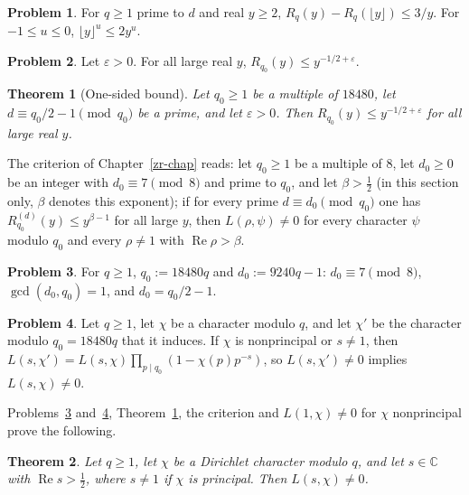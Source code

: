 \documentclass[reqno]{amsart}
\newcounter{chap}
\theoremstyle{definition}
\newtheorem{problem}{Problem}[section]
\theoremstyle{plain}
\newtheorem{theorem}{Theorem}[section]
\newcommand{\C}{{\mathbb{C}}}
\begin{document}
\begin{problem}\label{pr:floor}
For \(q \ge 1\) prime to \(d\) and real \(y \ge 2\), \(R_q(y) - R_q(\lfloor y \rfloor) \le 3/y\).  For \(-1 \le u \le 0\), \(\lfloor y \rfloor^{u} \le 2y^{u}\).
\end{problem}

\begin{problem}\label{pr:reals}
Let \(\varepsilon > 0\).  For all large real \(y\), \(R_{q_0}(y) \le y^{-1/2 + \varepsilon}\).
\end{problem}

\begin{theorem}[One-sided bound]\label{thm:one-sided}
Let \(q_0 \ge 1\) be a multiple of \(18480\), let \(d \equiv q_0/2 - 1 \pmod{q_0}\) be a prime, and let \(\varepsilon > 0\).  Then \(R_{q_0}(y) \le y^{-1/2 + \varepsilon}\) for all large real \(y\).
\end{theorem}

The criterion of Chapter~\ref{zr-chap} reads: let \(q_0 \ge 1\) be a multiple of \(8\), let \(d_0 \ge 0\) be an integer with \(d_0 \equiv 7 \pmod 8\) and prime to \(q_0\), and let \(\beta > \frac12\) (in this section only, \(\beta\) denotes this exponent); if for every prime \(d \equiv d_0 \pmod{q_0}\) one has \(R^{(d)}_{q_0}(y) \le y^{\beta - 1}\) for all large \(y\), then \(L(\rho, \psi) \ne 0\) for every character \(\psi\) modulo \(q_0\) and every \(\rho \ne 1\) with \(\operatorname{Re}\rho > \beta\).

\begin{problem}\label{pr:d0}
For \(q \ge 1\), \(q_0 := 18480q\) and \(d_0 := 9240q - 1\): \(d_0 \equiv 7 \pmod 8\), \(\gcd(d_0, q_0) = 1\), and \(d_0 = q_0/2 - 1\).
\end{problem}

\begin{problem}\label{pr:induced}
Let \(q \ge 1\), let \(\chi\) be a character modulo \(q\), and let \(\chi'\) be the character modulo \(q_0 = 18480q\) that it induces.  If \(\chi\) is nonprincipal or \(s \ne 1\), then \(L(s, \chi') = L(s, \chi)\prod_{p \mid q_0}(1 - \chi(p)p^{-s})\), so \(L(s, \chi') \ne 0\) implies \(L(s, \chi) \ne 0\).
\end{problem}

Problems~\ref{pr:d0} and~\ref{pr:induced}, Theorem~\ref{thm:one-sided}, the criterion and \(L(1, \chi) \ne 0\) for \(\chi\) nonprincipal prove the following.

\begin{theorem}\label{thm:grh}
Let \(q \ge 1\), let \(\chi\) be a Dirichlet character modulo \(q\), and let \(s \in \C\) with \(\operatorname{Re} s > \frac12\), where \(s \ne 1\) if \(\chi\) is principal.  Then \(L(s, \chi) \ne 0\).
\end{theorem}
\end{document}
